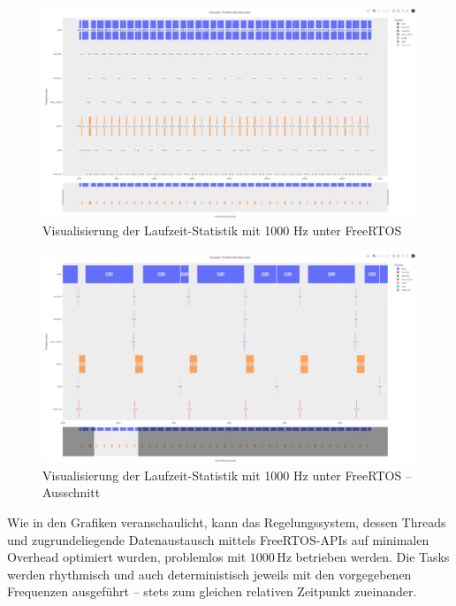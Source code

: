 \begin{figure}[H]
    \centering
    \includegraphics[width=1\textwidth]{assets/freertos_profiling_1000hz}
    \caption{Visualisierung der Laufzeit-Statistik mit 1000 Hz unter FreeRTOS}
\end{figure}
\begin{figure}[H]
    \centering
    \includegraphics[width=1\textwidth]{assets/freertos_profiling_1000hz_ausschnitt}
    \caption{Visualisierung der Laufzeit-Statistik mit 1000 Hz unter FreeRTOS --
    Ausschnitt}
\end{figure}

Wie in den Grafiken veranschaulicht, kann das Regelungssystem, dessen Threads
und zugrundeliegende Datenaustausch mittels FreeRTOS-APIs auf minimalen Overhead
optimiert wurden, problemlos mit $1000\,\text{Hz}$ betrieben werden. Die Tasks
werden rhythmisch und auch deterministisch jeweils mit den vorgegebenen
Frequenzen ausgeführt -- stets zum gleichen relativen Zeitpunkt zueinander.

